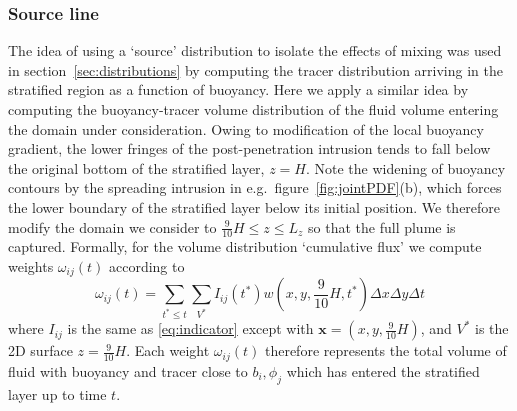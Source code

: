 \documentclass[a4paper]{article}
\begin{document}
\subsubsection{Source line}
The idea of using a `source' distribution to isolate the effects of mixing was used in
section~\ref{sec:distributions} by computing the tracer distribution arriving in the stratified region as a
function of buoyancy. Here we apply a similar idea by computing the buoyancy-tracer volume distribution of the
fluid volume entering the domain under consideration. Owing to modification of the local buoyancy gradient,
the lower fringes of the post-penetration intrusion tends to fall below the original bottom of the stratified
layer, $z=H$. Note the widening of buoyancy contours by the spreading intrusion in e.g.\
figure~\ref{fig:jointPDF}(b), which forces the lower boundary of the stratified layer below its initial
position. We therefore modify the domain we consider to $\frac{9}{10}H \le z \le L_z$ so that the full plume
is captured. Formally, for the volume distribution `cumulative flux' we compute weights $\omega_{ij}(t)$
according to
\begin{equation}
	\omega_{ij}(t) = \sum_{t^* \le t} \sum_{V^*} I_{ij}(t^*) w(x, y, \frac{9}{10}H, t^*) \Delta x \Delta y \Delta
	t
\end{equation}
where $I_{ij}$ is the same as \eqref{eq:indicator} except with $\bm{x} = (x, y, \frac{9}{10}H)$, and $V^*$ is
the 2D surface $z=\frac{9}{10}H$. Each weight $\omega_{ij}(t)$ therefore represents the total volume of fluid
with buoyancy and tracer close to $b_i, \phi_j$ which has entered the stratified layer up to time $t$.
\end{document}
